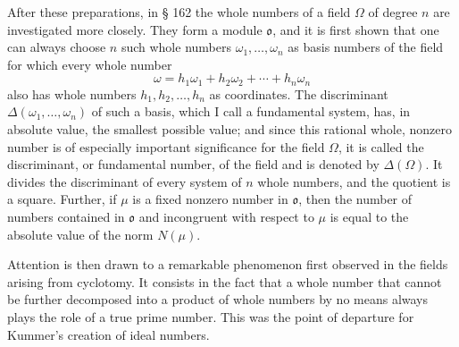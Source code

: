 \documentclass[11pt]{article}
\newcommand{\ideal}[1]{\mathfrak{#1}}
\begin{document}
After these preparations, in § 162 the whole numbers of a field $\Omega$ of degree $n$ are investigated more closely. They form a module $\ideal{o}$, and it is first shown that one can always choose $n$ such whole numbers $\omega_1,\ldots,\omega_n$ as basis numbers of the field for which every whole number
\[
\omega=h_1\omega_1+h_2\omega_2+\cdots+h_n\omega_n
\]
also has whole numbers $h_1,h_2,\ldots,h_n$ as coordinates. The discriminant $\Delta(\omega_1,\ldots,\omega_n)$ of such a basis, which I call a fundamental system, has, in absolute value, the smallest possible value; and since this rational whole, nonzero number is of especially important significance for the field $\Omega$, it is called the discriminant, or fundamental number, of the field and is denoted by $\Delta(\Omega)$. It divides the discriminant of every system of $n$ whole numbers, and the quotient is a square. Further, if $\mu$ is a fixed nonzero number in $\ideal{o}$, then the number of numbers contained in $\ideal{o}$ and incongruent with respect to $\mu$ is equal to the absolute value of the norm $N(\mu)$.

Attention is then drawn to a remarkable phenomenon first observed in the fields arising from cyclotomy. It consists in the fact that a whole number that cannot be further decomposed into a product of whole numbers by no means always plays the role of a true prime number. This was the point of departure for Kummer's creation of ideal numbers.
\end{document}
